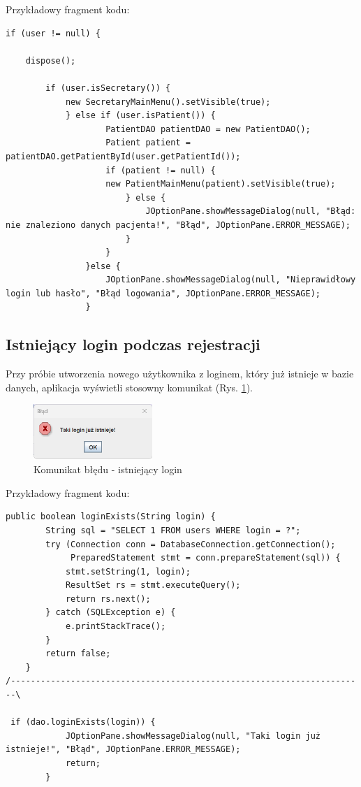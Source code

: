 Przykładowy fragment kodu:
\begin{lstlisting}[style=javaStyle, caption={Obsługa błędnego logowania — komunikat dla użytkownika}]
 if (user != null) {

    dispose();

        if (user.isSecretary()) {
            new SecretaryMainMenu().setVisible(true);
            } else if (user.isPatient()) {
                    PatientDAO patientDAO = new PatientDAO();
                    Patient patient = patientDAO.getPatientById(user.getPatientId());
                    if (patient != null) {
                    new PatientMainMenu(patient).setVisible(true);
                        } else {
                            JOptionPane.showMessageDialog(null, "Błąd: nie znaleziono danych pacjenta!", "Błąd", JOptionPane.ERROR_MESSAGE);
                        }
                    }
                }else {
                    JOptionPane.showMessageDialog(null, "Nieprawidłowy login lub hasło", "Błąd logowania", JOptionPane.ERROR_MESSAGE);
                }
\end{lstlisting}

\subsection{Istniejący login podczas rejestracji}

Przy próbie utworzenia nowego użytkownika z loginem, który już istnieje w bazie danych, aplikacja wyświetli stosowny komunikat (Rys. \ref{fig:loginExists}).

\begin{figure}[H]
\centering
\includegraphics[width=0.4\textwidth]{figures/ThisLoginAlrExists.png}
\caption{Komunikat błędu - istniejący login}
\label{fig:loginExists}
\end{figure}

Przykładowy fragment kodu:
\begin{lstlisting}[style=javaStyle, caption={Walidacja unikalności loginu podczas rejestracji użytkownika}]
 public boolean loginExists(String login) {
        String sql = "SELECT 1 FROM users WHERE login = ?";
        try (Connection conn = DatabaseConnection.getConnection();
             PreparedStatement stmt = conn.prepareStatement(sql)) {
            stmt.setString(1, login);
            ResultSet rs = stmt.executeQuery();
            return rs.next();
        } catch (SQLException e) {
            e.printStackTrace();
        }
        return false;
    }    
/-----------------------------------------------------------------------\

 if (dao.loginExists(login)) {
            JOptionPane.showMessageDialog(null, "Taki login już istnieje!", "Błąd", JOptionPane.ERROR_MESSAGE);
            return;
        }

\end{lstlisting}

